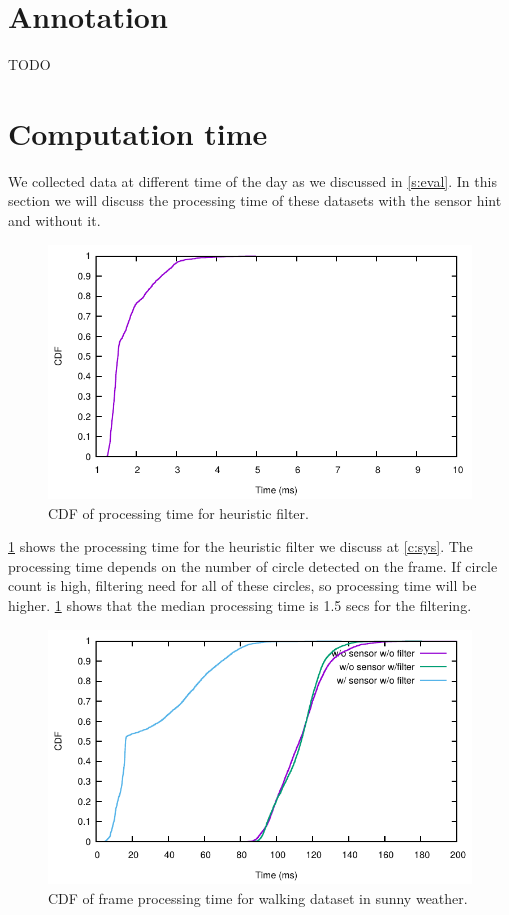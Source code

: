 \section{Annotation}
TODO

\section{Computation time}
We collected data at different time of the day as we discussed in \ref{s:eval}.
In this section we will discuss the processing time of these datasets with the sensor hint and without it.

\begin{figure}[h!]
\centering
\includegraphics[width=5.2in]{plots/sunny_cdf_filter.pdf}
\caption{CDF of processing time for heuristic filter.}
\label{f:cdf_fil}
\end{figure}

\ref{f:cdf_fil} shows the processing time for the heuristic filter we discuss at \ref{c:sys}.
The processing time depends on the number of circle detected on the frame.
If circle count is high, filtering need for all of these circles, so processing time will be higher.
\ref{f:cdf_fil} shows that the median processing time is 1.5 secs for the filtering. 

\begin{figure}[h!]
\centering
\includegraphics[width=5.2in]{plots/sunny_cdf_time.pdf}
\caption{CDF of frame processing time for walking dataset in sunny weather.}
\label{f:cdf_sunny}
\end{figure}

